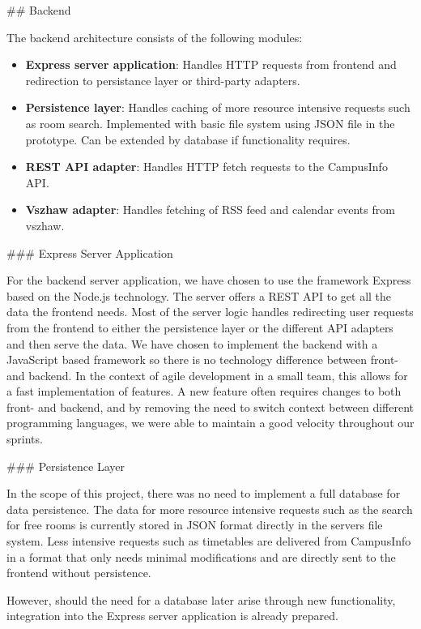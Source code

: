 \begin{markdown}
## Backend

The backend architecture consists of the following modules:

\begin{itemize}
  \item \textbf{Express server application}: Handles HTTP requests from frontend and redirection to persistance layer or third-party adapters.
  \item \textbf{Persistence layer}: Handles caching of more resource intensive requests such as room search. Implemented with basic file system using JSON file in the prototype. Can be extended by database if functionality requires.
  \item \textbf{REST API adapter}: Handles HTTP fetch requests to the CampusInfo API.
  \item \textbf{Vszhaw adapter}: Handles fetching of RSS feed and calendar events from vszhaw.
\end{itemize}

### Express Server Application

For the backend server application, we have chosen to use the framework Express \cite{Express} based on the Node.js \cite{Node} technology. The server offers a REST API to get all the data the frontend needs. Most of the server logic handles redirecting user requests from the frontend to either the persistence layer or the different API adapters and then serve the data. We have chosen to implement the backend with a JavaScript based framework so there is no technology difference between front- and backend. In the context of agile development in a small team, this allows for a fast implementation of features. A new feature often requires changes to both front- and backend, and by removing the need to switch context between different programming languages, we were able to maintain a good velocity throughout our sprints.

### Persistence Layer

In the scope of this project, there was no need to implement a full database for data persistence. The data for more resource intensive requests such as the search for free rooms is currently stored in JSON format directly in the servers file system. Less intensive requests such as timetables are delivered from CampusInfo in a format that only needs minimal modifications and are directly sent to the frontend without persistence.

However, should the need for a database later arise through new functionality, integration into the Express server application is already prepared.


\end{markdown}

